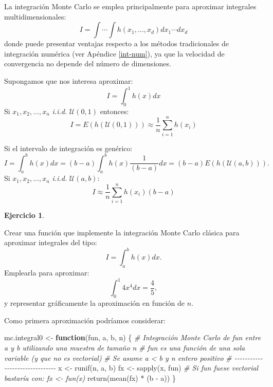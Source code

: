 \documentclass[
]{book}
\newenvironment{Shaded}{\begin{snugshade}}{\end{snugshade}}
\newcommand{\CommentTok}[1]{\textcolor[rgb]{0.56,0.35,0.01}{\textit{#1}}}
\newcommand{\ControlFlowTok}[1]{\textcolor[rgb]{0.13,0.29,0.53}{\textbf{#1}}}
\newcommand{\FunctionTok}[1]{\textcolor[rgb]{0.00,0.00,0.00}{#1}}
\newcommand{\NormalTok}[1]{#1}
\newcommand{\OtherTok}[1]{\textcolor[rgb]{0.56,0.35,0.01}{#1}}
\newcommand{\SpecialCharTok}[1]{\textcolor[rgb]{0.00,0.00,0.00}{#1}}
\theoremstyle{break}
\theoremstyle{definition}
\theoremstyle{definition}
\theoremstyle{definition}
\newtheorem{exercise}{Ejercicio}[chapter]
\theoremstyle{definition}
\theoremstyle{remark}
\begin{document}
La integración Monte Carlo se emplea principalmente para aproximar integrales multidimensionales:
\[I = \int \cdots \int h\left( x_1,\ldots ,x_d\right) dx_1 \cdots dx_d\]
donde puede presentar ventajas respecto a los métodos tradicionales de integración numérica (ver Apéndice \ref{int-num}),
ya que la velocidad de convergencia no depende del número de dimensiones.

Supongamos que nos interesa aproximar:
\[I = \int_0^1h\left( x\right) dx\]
Si \(x_1,x_2,\ldots ,x_n\) \emph{i.i.d.} \(\mathcal{U}\left( 0,1\right)\)
entonces:
\[I = E\left( h\left( \mathcal{U}\left( 0,1\right) \right) \right)
\approx \frac{1}{n}\sum\limits_{i=1}^nh\left( x_i\right)\]

Si el intervalo de integración es
genérico:
\[I = \int_a^bh\left( x\right) dx = 
(b-a)\int_a^bh\left( x\right) \frac1{(b-a)}dx = 
(b-a)E\left( h\left( \mathcal{U}\left( a, b \right) \right) \right).\]
Si \(x_1,x_2,\ldots ,x_n\) \emph{i.i.d.}
\(\mathcal{U}\left( a, b\right)\):
\[I\approx \frac{1}{n}\sum\limits_{i=1}^nh\left( x_i\right) (b-a)\]

\begin{exercise}
\protect\hypertarget{exr:mc-integral-clas}{}{\label{exr:mc-integral-clas} }

Crear una función que implemente la integración Monte Carlo clásica
para aproximar integrales del tipo:
\[I = \int_a^b h(x)  dx.\]
Emplearla para aproximar:
\[\int_0^1 4x^4 dx = \frac{4}{5},\]
y representar gráficamente la aproximación en función de \(n\).
\end{exercise}

Como primera aproximación podríamos considerar:

\begin{Shaded}
\begin{Highlighting}[]
\NormalTok{mc.integral0 }\OtherTok{\textless{}{-}} \ControlFlowTok{function}\NormalTok{(fun, a, b, n) \{}
  \CommentTok{\# Integración Monte Carlo de fun entre a y b utilizando una muestra de tamaño n}
  \CommentTok{\# fun es una función de una sola variable (y que no es vectorial)}
  \CommentTok{\# Se asume a \textless{} b y n entero positivo}
  \CommentTok{\# {-}{-}{-}{-}{-}{-}{-}{-}{-}{-}{-}{-}{-}{-}{-}{-}{-}{-}{-}{-}{-}{-}{-}{-}{-}{-}{-}{-}{-}{-}{-}}
\NormalTok{  x }\OtherTok{\textless{}{-}} \FunctionTok{runif}\NormalTok{(n, a, b)}
\NormalTok{  fx }\OtherTok{\textless{}{-}} \FunctionTok{sapply}\NormalTok{(x, fun) }\CommentTok{\# Si fun fuese vectorial bastaría con: fx \textless{}{-} fun(x)}
  \FunctionTok{return}\NormalTok{(}\FunctionTok{mean}\NormalTok{(fx) }\SpecialCharTok{*}\NormalTok{ (b }\SpecialCharTok{{-}}\NormalTok{ a))}
\NormalTok{\}}
\end{Highlighting}
\end{Shaded}
\end{document}
